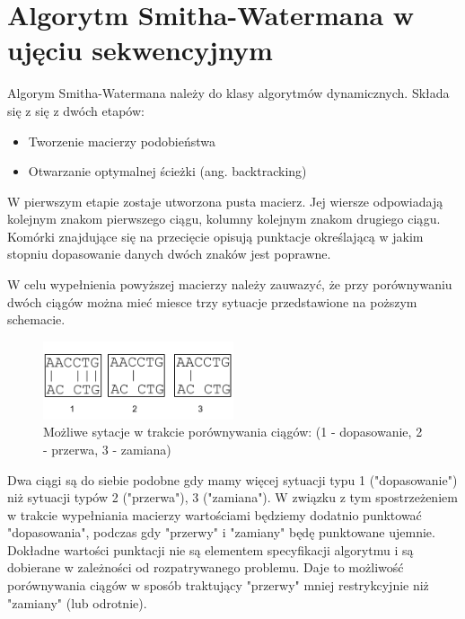 \documentclass[a4paper,12pt]{article}
\newenvironment{lista}{
\begin{itemize}
  \setlength{\itemsep}{1pt}
  \setlength{\parskip}{0pt}
  \setlength{\parsep}{0pt}
}{\end{itemize}}
\begin{document}
\section*{Algorytm Smitha-Watermana w ujęciu sekwencyjnym}

Algorym Smitha-Watermana należy do klasy algorytmów dynamicznych. Składa się z się z dwóch etapów:
\begin{lista}
 \item Tworzenie macierzy podobieństwa
\item Otwarzanie optymalnej ścieżki (ang. backtracking)
\end{lista}

W pierwszym etapie zostaje utworzona pusta macierz. Jej wiersze odpowiadają kolejnym znakom pierwszego ciągu, kolumny kolejnym znakom drugiego ciągu. Komórki znajdujące się na przecięcie opisują punktacje określającą w jakim stopniu dopasowanie danych dwóch znaków jest poprawne. 

W celu wypełnienia powyższej macierzy należy zauwazyć, że przy porównywaniu dwóch ciągów można mieć miesce trzy sytuacje przedstawione na poższym schemacie.

\begin{figure}[H]
  \vspace{5pt}
  \centering
  \begin{center}
  \includegraphics[width=0.5\textwidth]{images/TypySytuacjiPrzyDopasowaniu.png}
  \end{center}
  \caption{Możliwe sytacje w trakcie porównywania ciągów: (1 - dopasowanie, 2 - przerwa, 3 - zamiana)}
 \end{figure}


Dwa ciągi są do siebie podobne gdy mamy więcej sytuacji typu 1 ("dopasowanie") niż sytuacji typów 2 ("przerwa"), 3 ("zamiana"). W związku z tym spostrzeżeniem w trakcie wypełniania macierzy wartościami będziemy dodatnio punktować "dopasowania", podczas gdy "przerwy" i "zamiany" będę punktowane ujemnie. Dokładne wartości punktacji nie są elementem specyfikacji algorytmu i są dobierane w zależności od rozpatrywanego problemu. Daje to możliwość porównywania ciągów w sposób traktujący "przerwy" mniej restrykcyjnie niż "zamiany" (lub odrotnie). 
\end{document}
